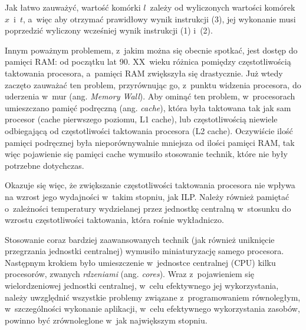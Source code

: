 \documentclass{mwart}
\begin{document}
	Jak łatwo zauważyć, wartość komórki $l$~zależy od wyliczonych wartości komórek $x$~i~$t$, a~więc aby otrzymać prawidłowy wynik
	instrukcji (3), jej wykonanie musi poprzedzić wyliczony wcześniej wynik instrukcji (1) i~(2).
\par
%
\indent
	Innym poważnym problemem, z~jakim można się obecnie spotkać, jest dostęp do pamięci RAM: od początku lat 90. XX~wieku różnica
	pomiędzy częstotliwością taktowania procesora, a~pamięci RAM zwiększyła się drastycznie. Już wtedy zaczęto zauważać
	ten problem, przyrównując go, z~punktu widzenia procesora, do uderzenia w~mur (ang. \emph{Memory Wall}). Aby ominąć ten problem,
	w~procesorach umieszczano pamięć podręczną (ang. \emph{cache}), która była taktowana tak jak sam procesor (cache pierwszego poziomu, L1 cache),
	lub częstotliwością niewiele odbiegającą od częstotliwości taktowania procesora (L2 cache). Oczywiście ilość pamięci podręcznej
	była nieporównywalnie mniejsza od ilości pamięci RAM, tak więc pojawienie się pamięci cache wymusiło stosowanie technik, które nie
	były potrzebne dotychczas.
\par
%
\indent
	Okazuje się więc, że zwiększanie częstotliwości taktowania procesora nie wpływa na wzrost jego wydajności w~takim stopniu, jak ILP.
	Należy również pamiętać o~zależności temperatury wydzielanej przez jednostkę centralną w~stosunku do wzrostu częstotliwości taktowania,
	która rośnie wykładniczo.
\par
%
\indent
	Stosowanie coraz bardziej zaawansowanych technik (jak również uniknięcie przegrzania jednostki centralnej)
	wymusiło miniaturyzację samego procesora. Następnym krokiem było umieszczenie w~jednostce
	centralnej (CPU) kilku procesorów, zwanych \emph{rdzeniami} (ang. \emph{cores}). Wraz z~pojawieniem się wielordzeniowej jednostki centralnej,
	w~celu efektywnego jej wykorzystania, należy uwzględnić wszystkie problemy związane z~programowaniem równoległym, w~szczególności
	wykonanie aplikacji, w~celu efektywnego wykorzystania zasobów, powinno być zrównoleglone w~jak największym stopniu.
\par
\end{document}
